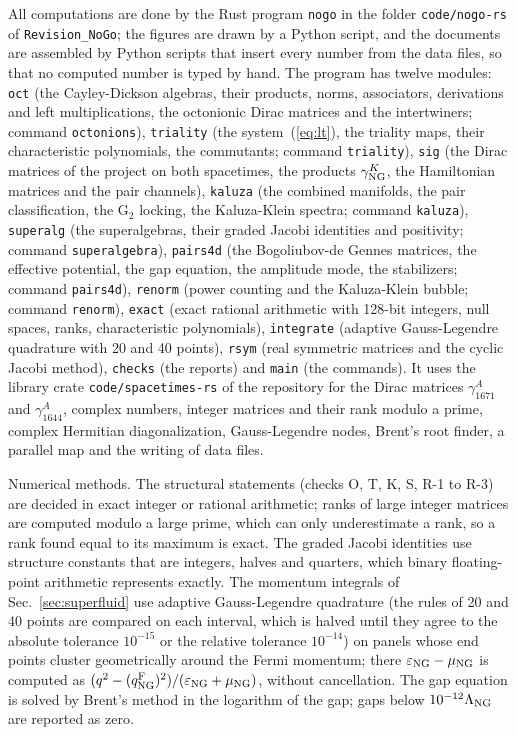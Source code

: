 All computations are done by the Rust program \texttt{nogo} in the folder \texttt{code/nogo-rs} of
\texttt{Revision\_NoGo}; the figures are drawn by a Python script, and the documents are assembled by
Python scripts that insert every number from the data files, so that no computed number is typed by
hand. The program has twelve modules: \texttt{oct} (the Cayley-Dickson algebras, their products,
norms, associators, derivations and left multiplications, the octonionic Dirac matrices and the
intertwiners; command \texttt{octonions}), \texttt{triality} (the system~(\ref{eq:lt}), the triality maps,
their characteristic polynomials, the commutants; command \texttt{triality}), \texttt{sig} (the Dirac
matrices of the project on both spacetimes, the products $\gamma^K_{\rm NG}$, the Hamiltonian matrices and
the pair channels), \texttt{kaluza} (the combined manifolds, the pair classification, the $\mathrm G_2$
locking, the Kaluza-Klein spectra; command \texttt{kaluza}), \texttt{superalg} (the superalgebras, their
graded Jacobi identities and positivity; command \texttt{superalgebra}), \texttt{pairs4d} (the
Bogoliubov-de Gennes matrices, the effective potential, the gap equation, the amplitude mode, the
stabilizers; command \texttt{pairs4d}), \texttt{renorm} (power counting and the Kaluza-Klein bubble;
command \texttt{renorm}), \texttt{exact} (exact rational arithmetic with 128-bit integers, null spaces,
ranks, characteristic polynomials), \texttt{integrate} (adaptive Gauss-Legendre quadrature with 20 and
40 points), \texttt{rsym} (real symmetric matrices and the cyclic Jacobi method), \texttt{checks} (the
reports) and \texttt{main} (the commands). It uses the library crate \texttt{code/spacetimes-rs} of the
repository for the Dirac matrices $\gamma^A_{1671}$ and $\gamma^A_{1644}$, complex numbers, integer
matrices and their rank modulo a prime, complex Hermitian diagonalization, Gauss-Legendre nodes,
Brent's root finder, a parallel map and the writing of data files.

Numerical methods. The structural statements (checks O, T, K, S, R-1 to R-3) are decided in exact
integer or rational arithmetic; ranks of large integer matrices are computed modulo a large prime,
which can only underestimate a rank, so a rank found equal to its maximum is exact. The graded Jacobi
identities use structure constants that are integers, halves and quarters, which binary floating-point
arithmetic represents exactly. The momentum integrals of Sec.~\ref{sec:superfluid} use adaptive
Gauss-Legendre quadrature (the rules of 20 and 40 points are compared on each interval, which is halved
until they agree to the absolute tolerance $10^{-15}$ or the relative tolerance $10^{-14}$) on panels
whose end points cluster geometrically around the Fermi momentum; there $\varepsilon_{\rm NG}-\mu_{\rm NG}$
is computed as $(q^2-(q^{\rm F}_{\rm NG})^2)/(\varepsilon_{\rm NG}+\mu_{\rm NG})$, without cancellation. The
gap equation is solved by Brent's method in the logarithm of the gap; gaps below
$10^{-12}\Lambda_{\rm NG}$ are reported as zero.

